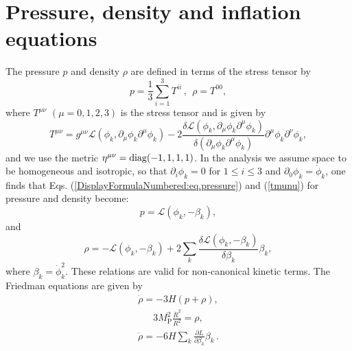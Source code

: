 \documentclass[a4paper,11pt]{article}
\begin{document}
\section{Pressure, density and inflation equations \label{sec4}}
  The pressure $p$ and density $\rho$ are defined in terms of the stress tensor by
  \begin{equation}\label{DisplayFormulaNumbered:eq.pressure}
    p= \frac{1}{3} \sum_{i=1}^3 T^{ii}\,,
    ~~\rho =T^{00},
  \end{equation}
  where $T^{\mu\nu}$ $(\mu=0, 1, 2, 3)$ is the stress tensor and is given by
  \begin{equation}
    T^{\mu \nu}=g^{\mu \nu} \mathcal{L}\left(\phi_k,\partial_\mu \phi_k \partial^\mu \phi_k \right)-2\frac{\delta \mathcal{L}\left(\phi_k,\partial_\mu \phi_k \partial^\mu \phi_k \right)}{\delta \left(\partial_\mu \phi_k \partial^\mu \phi_k \right)}\partial^\mu \phi_k \partial^\nu \phi_k,
    \label{tmunu}
  \end{equation}
  and we use the metric $\eta^{\mu\nu}= {\rm diag}(-1, 1, 1, 1)$.
  In the analysis we assume space to be homogeneous and isotropic, so that $\partial_i\phi_k = 0$ for $1 \leq i \leq 3$ and 
	$\partial_0 \phi_{k} = \dot{\phi}_k$,
  one finds that Eqs. (\ref{DisplayFormulaNumbered:eq.pressure}) and (\ref{tmunu})
  for pressure and density become:
  \begin{equation}\label{DisplayFormulaNumbered:eq.pressure.cosmology}
    p = \mathcal{L}\left(\phi_k, - \beta_k \right),
  \end{equation}
  and
  \begin{equation}\label{DisplayFormulaNumbered:eq.density.cosmology}
    \rho = -\mathcal{L}\left(\phi_k, - \beta_k\right) + 2\sum_{k}\frac{\delta \mathcal{L}\left(\phi_k, - \beta_k \right)}{\delta \beta_k}
    \beta_k,
  \end{equation}
  where $\beta_k = \dot \phi_k^2$.
  These relations are valid for non-canonical kinetic terms.
  The Friedman equations are given by
  \begin{align}
    \dot \rho = -3H (p + \rho),
    \label{fried1}
  \end{align}
  \begin{align}
    3 M_\text{P}^2 \frac{\dot R^2}{R^2} = \rho,
    \label{fried2}
  \end{align}
  \begin{align}
    \dot\rho= - 6H \sum_{k} \frac{\partial L}{\partial \beta_k} \beta_k\,.
    \label{rhodot1}
  \end{align}
\end{document}
